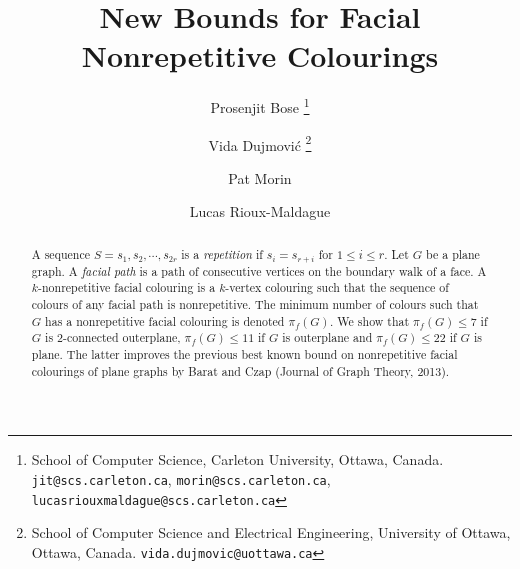 \documentclass{patmorin}
\newcommand*\samethanks[1][\value{footnote}]{\footnotemark[#1]}
\begin{document}

\title{New Bounds for Facial Nonrepetitive Colourings}
\date{}


%
%
\author{Prosenjit Bose \thanks{School of Computer Science, Carleton University, Ottawa, Canada. \texttt{jit@scs.carleton.ca}, \texttt{morin@scs.carleton.ca}, \texttt{lucasriouxmaldague@scs.carleton.ca}} %
\and Vida Dujmovi{\'c} \thanks{School of Computer Science and Electrical Engineering, University of Ottawa, Ottawa, Canada. \texttt{vida.dujmovic@uottawa.ca}}
\and Pat Morin\samethanks[1] \and Lucas Rioux-Maldague\samethanks[1] }
%



%
%

\maketitle

\begin{abstract}
A sequence $S=s_1,s_2,\cdots,s_{2r}$ is a \emph{repetition} if $s_i=s_{r+i}$ for $1 \leq i \leq r$. Let $G$ be a plane graph. A \emph{facial path} is a path of consecutive vertices on the boundary walk of a face. A $k$-nonrepetitive facial colouring is a $k$-vertex colouring such that the sequence of colours of any facial path is nonrepetitive. The minimum number of colours such that $G$ has a nonrepetitive facial colouring is denoted $\pi_f(G)$. We show that $\pi_f(G)\leq 7$ if $G$ is 2-connected outerplane, $\pi_f(G) \leq 11$ if $G$ is outerplane and $\pi_f(G)\leq 22$ if $G$ is plane. The latter improves the previous best known bound on nonrepetitive facial colourings of plane graphs by Barat and Czap (Journal of Graph Theory, 2013).
\end{abstract}
\end{document}
